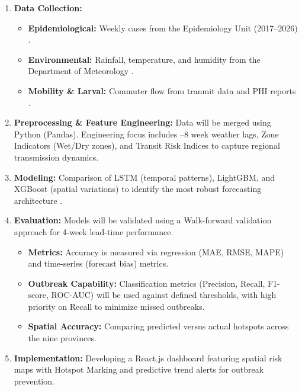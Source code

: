 ﻿\documentclass[12pt,a4paper]{article}
\begin{document}
\begin{enumerate}
    \item \textbf{Data Collection:} 
    \begin{itemize}
        \item \textbf{Epidemiological:} Weekly cases from the Epidemiology Unit (2017--2026) \parencite{wickramathilaka2024}.
        \item \textbf{Environmental:} Rainfall, temperature, and humidity from the Department of Meteorology \parencite{withanage2018}.
        \item \textbf{Mobility \& Larval:} Commuter flow from tranmit data  and PHI reports \parencite{karasinghe2024}.
    \end{itemize}

    \item \textbf{Preprocessing \& Feature Engineering:} Data will be merged using Python (Pandas). Engineering focus includes --8 week weather lags, Zone Indicators (Wet/Dry zones), and Transit Risk Indices to capture regional transmission dynamics.

    \item \textbf{Modeling:} Comparison of LSTM (temporal patterns), LightGBM, and XGBoost (spatial variations) to identify the most robust forecasting architecture \parencite{bannoud2026, uduwanage2025}.

    \item \textbf{Evaluation:} Models will be validated using a Walk-forward validation approach for 4-week lead-time performance.
    \begin{itemize}
        \item \textbf{Metrics:} Accuracy is measured via regression (MAE, RMSE, MAPE) and time-series (forecast bias) metrics. 
        \item \textbf{Outbreak Capability:} Classification metrics (Precision, Recall, F1-score, ROC-AUC) will be used against defined thresholds, with high priority on Recall to minimize missed outbreaks.
        \item \textbf{Spatial Accuracy:} Comparing predicted versus actual hotspots across the nine provinces.
    \end{itemize}

    \item \textbf{Implementation:} Developing a React.js dashboard featuring spatial risk maps with Hotspot Marking and predictive trend alerts for outbreak prevention.
\end{enumerate}
\end{document}
